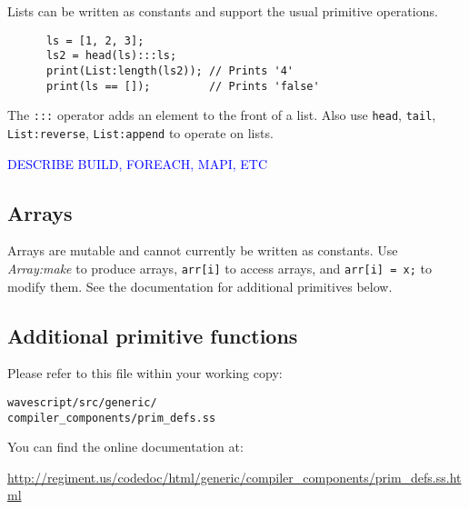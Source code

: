 \documentclass[twocolumn]{report}
\newcommand{\rednote}[1]{{\textcolor{blue}{#1}}}
\begin{document}
Lists can be written as constants and support the usual primitive
operations.  
\begin{verbatim}
      ls = [1, 2, 3];
      ls2 = head(ls):::ls;
      print(List:length(ls2)); // Prints '4'
      print(ls == []);         // Prints 'false'
\end{verbatim}

The {\tt :::} operator adds an element to the front of a list.  Also
use {\tt head}, {\tt tail}, {\tt List:reverse}, {\tt List:append} to operate on
lists. 

\rednote{DESCRIBE BUILD, FOREACH, MAPI, ETC}

\subsection{Arrays}

Arrays are mutable and cannot currently be written as constants.  Use
{\em Array:make} to produce arrays, {\tt arr[i]} to access arrays, and
{\tt arr[i] = x;} to modify them.  See the documentation for
additional primitives below.


\subsection{Additional primitive functions}

Please refer to this file within your working copy:
\vspace{-2mm}
\begin{center}
{\tt{wavescript/src/generic/\\compiler\_components/prim\_defs.ss}}
\end{center}

You can find the online documentation at:
\vspace{-2mm}
\begin{center}
\url{http://regiment.us/codedoc/html/generic/compiler\_components/prim\_defs.ss.html}
\end{center}



\end{document}
